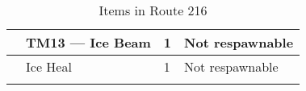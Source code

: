\begin{longtable}{|| l l l l ||}%
\hline%
&TM13 — Ice Beam&1&Not respawnable\\%
\hline%
&Ice Heal&1&Not respawnable\\%
\hline%
\endhead%
\hline%
\caption{Items in Route 216}%
\label{tab:Route216Items}%
\end{longtable}